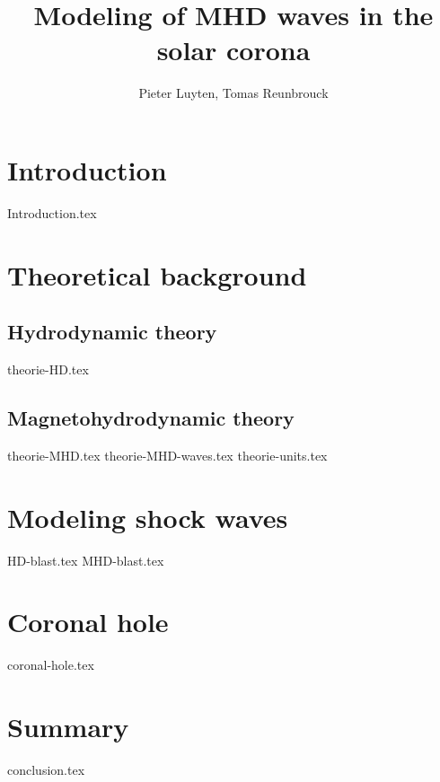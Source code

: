 \documentclass[a4paper]{article}
\title{Modeling of MHD waves in the solar corona}
\author{Pieter Luyten, Tomas Reunbrouck}
\begin{document}
\maketitle
\newpage
\tableofcontents
\newpage

\section{Introduction}
{Introduction.tex}
\newpage

\section{Theoretical background}

\subsection{Hydrodynamic theory}
{theorie-HD.tex}
\newpage

\subsection{Magnetohydrodynamic theory}
{theorie-MHD.tex}
{theorie-MHD-waves.tex}
{theorie-units.tex}
\newpage

\section{Modeling shock waves}
{HD-blast.tex}
\newpage
{MHD-blast.tex}
\newpage

\section{Coronal hole}
{coronal-hole.tex}
\newpage

\section{Summary}
{conclusion.tex}


\end{document}
